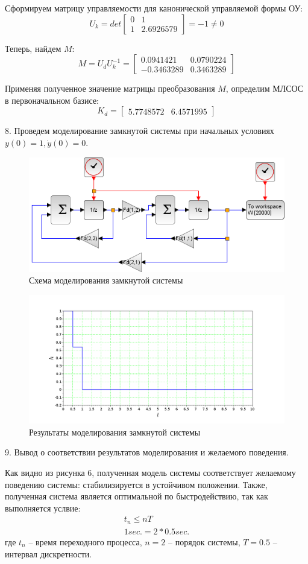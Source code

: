 \documentclass[a4paper,14pt]{extreport}
\begin{document}
Сформируем матрицу управляемости для канонической управляемой формы ОУ:
\begin{equation}
U_k =det
\begin{bmatrix}
0&1\\
1&2.6926579
\end{bmatrix}
=- 1  \ne 0
\end{equation}

Теперь, найдем $M$:
\begin{equation}
	M = U_d U_k^{-1} =
	\begin{bmatrix}
	    0.0941421  &  0.0790224  \\
	- 0.3463289   & 0.3463289  
	\end{bmatrix}
\end{equation}

Применяя полученное значение матрицы преобразования $M$, определим МЛСОС в первоначальном базисе:
\begin{equation}
K_d = 
\begin{bmatrix}
    5.7748572    &6.4571995 
\end{bmatrix}
\end{equation}

8. Проведем моделирование замкнутой системы при начальных условиях $y(0) = 1, \dot y(0) = 0$.
\begin{figure}[H]
	\center\includegraphics[width=0.7\linewidth]{model_fd.png}
	\caption{Схема моделирования замкнутой системы}
	\label{fig:scr1}
\end{figure}
\begin{figure}[H]
	\center\includegraphics[width=0.7\linewidth]{model_fd_res.png}
	\caption{Результаты моделирования замкнутой системы}
	\label{fig:scr1}
\end{figure}

9. Вывод о соответствии результатов моделирования и
желаемого поведения.

Как видно из рисунка 6, полученная модель системы соответствует
желаемому поведению системы: стабилизируется в устойчивом положении.
Также, полученная система является оптимальной по быстродействию, так как выполняется услвие:
\begin{align}
	t_n \le nT\\
	1 sec. = 2 * 0.5 sec.
\end{align}
где $t_n$ -- время переходного процесса, $n = 2$ -- порядок системы, $T = 0.5$ --
интервал дискретности.
\end{document}
